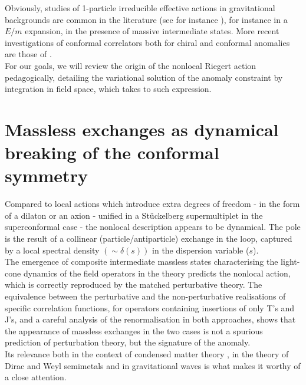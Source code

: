 \documentclass[a4paper,11pt,openright,twoside]{book}
\numberwithin{equation}{section}
\begin{document}
Obviously, studies of 1-particle irreducible effective actions in gravitational backgrounds are common in the literature (see for instance \cite{Bastianelli:2004zp,Bastianelli:2007jv,Bastianelli:2012bz,Coriano:2012wp}), for instance in a $E/m$ expansion, in the presence of massive intermediate states.
More recent investigations of conformal correlators both for chiral and conformal anomalies are those of \cite{Bastianelli:2019zrq,Bonora:2014qla,Bonora:2017gzz}.  \\
For our goals, we will review the origin of the nonlocal Riegert action pedagogically, detailing the variational solution of the anomaly constraint by integration in field space, which takes to such expression.  
\section*{Massless exchanges as dynamical breaking of the conformal symmetry}
Compared to local actions which introduce extra degrees of freedom - in the form of a dilaton or an axion - unified in a St\"uckelberg supermultiplet in the superconformal case - the nonlocal description appears to be dynamical. The pole is the result of a collinear (particle/antiparticle) exchange in the loop, captured by a local spectral density $(\sim\delta(s))$ in the dispersion variable ($s$).\\  
The emergence of composite intermediate massless states characterising the light-cone dynamics of the field operators in the theory predicts the nonlocal action, which is correctly reproduced by the matched perturbative theory. 
The equivalence between the perturbative and the non-perturbative realisations of specific correlation functions, for operators containing insertions of only T's and J's, and a careful analysis of the renormalisation in both approaches, shows that the appearance of massless exchanges in the two cases is not a spurious prediction of perturbation theory, but the signature of the anomaly. \\
Its relevance both in the context of condensed matter theory \cite{Chernodub:2019tsx,Arjona:2019lxz,Mottola:2019nui,Chernodub:2017jcp,Rinkel:2019kpo}, in the theory of Dirac and Weyl semimetals and in gravitational waves \cite{Mottola:2016mpl} is what makes it worthy of a close attention.
\end{document}
